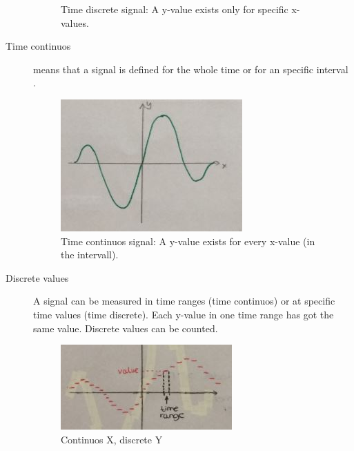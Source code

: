 \begin{description}
\begin{figure}[!h]
			\caption[Time discrete signal]{Time discrete signal: A y-value exists only for specific x-values.}
			\label{fig:timediscrete}
		\end{figure}
	\item[Time continuos] means that a signal is defined for the whole time or for an specific interval .
		\begin{figure}[!h]
			\centering
			\includegraphics[width=0.7\linewidth]{images/timecontinuos}
			\caption[Time continuos signal]{Time continuos signal: A y-value exists for every x-value (in the intervall).}
			\label{fig:timecontinuos}
		\end{figure}
	\item[Discrete values] A signal can be measured in time ranges (time continuos)  or at specific time values (time discrete). Each y-value in one time range has got the same value. Discrete values can be counted.
		\begin{figure}[!h]
			\centering
			\includegraphics[width=0.7\linewidth]{images/discreteY_continuosX}
			\caption[Continuos X, discrete Y]{Continuos X, discrete Y}
			\label{fig:discreteY_continuosX}
		\end{figure}
		

\end{description}
